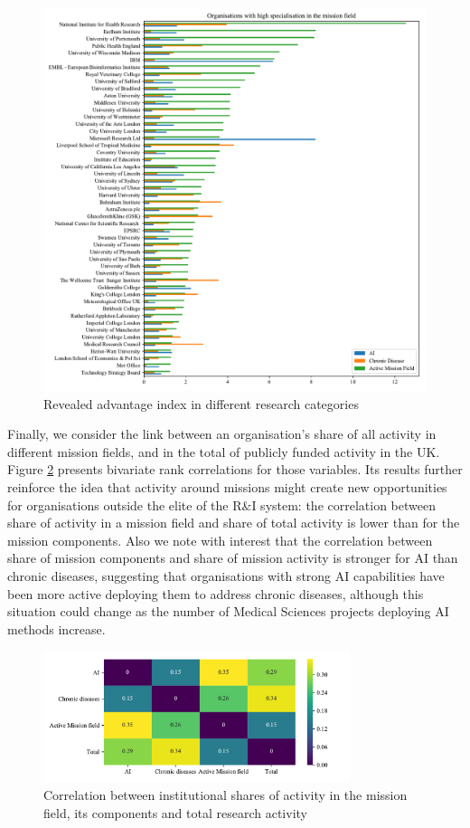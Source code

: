 \documentclass[11pt]{article}
\begin{document}
\begin{figure}[!ht]
    \centering
    \includegraphics[width=\textwidth]{figures/fig_15_top_orgs.pdf}
    \caption{Revealed advantage index in different research categories}
    \label{fig:top_orgs}
\end{figure}

Finally, we consider the link between an organisation’s share of all activity in different mission fields, and in the total of publicly funded activity in the UK. Figure \ref{fig:share_corr} presents bivariate rank correlations for those variables. Its results further reinforce the idea that activity around missions might create new opportunities for organisations outside the elite of the R&I system: the correlation between share of activity in a mission field and share of total activity is lower than for the mission components. Also we note with interest that the correlation between share of mission components and share of mission activity is stronger for AI than chronic diseases, suggesting that organisations with strong AI capabilities have been more active deploying them to address chronic diseases, although this situation could change as the number of Medical Sciences projects deploying AI methods increase.

\begin{figure}[!ht]
    \centering
    \includegraphics[width=0.8\textwidth]{figures/fig_16_correlation.pdf}
    \caption{Correlation between institutional shares of activity in the mission field, its components and total research activity}
    \label{fig:share_corr}
\end{figure}
\end{document}
